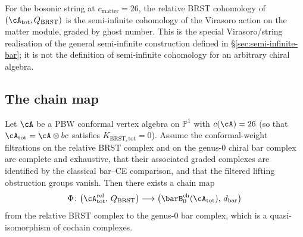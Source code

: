 For the bosonic string at $c_{\mathrm{matter}}=26$, the relative BRST
cohomology of $(\cA_{\mathrm{tot}},Q_{\mathrm{BRST}})$ is the
semi-infinite cohomology of the Virasoro action on the matter module,
graded by ghost number. This is the special Virasoro/string
realisation of the general semi-infinite construction defined in
\S\ref{sec:semi-infinite-bar}; it is not the definition of
semi-infinite cohomology for an arbitrary chiral algebra.

\subsection{The chain map}

\begin{theorem}
\label{thm:brst-bar-genus0}
Let $\cA$ be a PBW conformal vertex algebra on $\mathbb{P}^1$ with
$c(\cA) = 26$ \textup{(}so that
$\cA_{\mathrm{tot}} = \cA \otimes bc$ satisfies
$K_{\mathrm{BRST,tot}} = 0$\textup{)}. Assume the conformal-weight
filtrations on the relative BRST complex and on the genus-$0$ chiral
bar complex are complete and exhaustive, that their associated graded
complexes are identified by the classical bar--CE comparison, and that
the filtered lifting obstruction groups vanish. Then there exists a
chain map
\[
\Phi \colon
 \bigl(\cA_{\mathrm{tot}}^{\mathrm{rel}},\, Q_{\mathrm{BRST}}\bigr)
 \longrightarrow
 \bigl(\barB^{\mathrm{ch}}_0(\cA_{\mathrm{tot}}),\, d_{\mathrm{bar}}\bigr)
\]
from the relative BRST complex to the genus-$0$ bar complex, which is a
quasi-isomorphism of cochain complexes.
\end{theorem}

